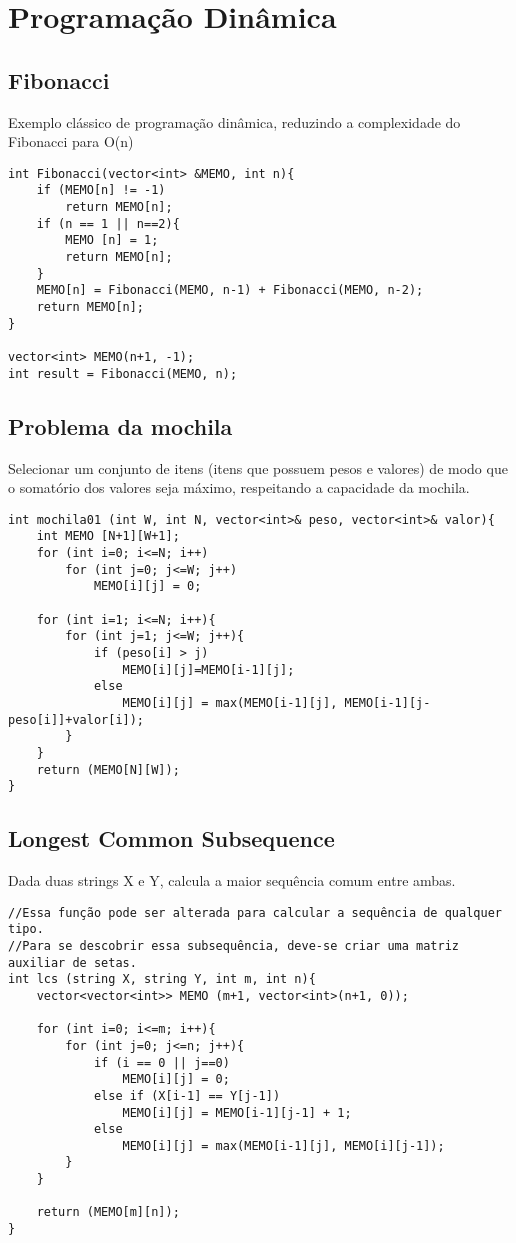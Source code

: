 \section{Programação Dinâmica}
    
    \subsection{Fibonacci}
        Exemplo clássico de programação dinâmica, reduzindo a complexidade do Fibonacci para O(n)
\begin{verbatim}
int Fibonacci(vector<int> &MEMO, int n){
    if (MEMO[n] != -1)
        return MEMO[n];
    if (n == 1 || n==2){
        MEMO [n] = 1;
        return MEMO[n];
    }
    MEMO[n] = Fibonacci(MEMO, n-1) + Fibonacci(MEMO, n-2);
    return MEMO[n];
}

vector<int> MEMO(n+1, -1);
int result = Fibonacci(MEMO, n);    
\end{verbatim}

\subsection{Problema da mochila}
    Selecionar um conjunto de itens (itens que possuem pesos e valores) de modo que o somatório dos valores seja máximo, respeitando a capacidade da mochila.
\begin{verbatim}
int mochila01 (int W, int N, vector<int>& peso, vector<int>& valor){
    int MEMO [N+1][W+1];
    for (int i=0; i<=N; i++)
        for (int j=0; j<=W; j++)
            MEMO[i][j] = 0;

    for (int i=1; i<=N; i++){
        for (int j=1; j<=W; j++){
            if (peso[i] > j)
                MEMO[i][j]=MEMO[i-1][j];
            else
                MEMO[i][j] = max(MEMO[i-1][j], MEMO[i-1][j-peso[i]]+valor[i]);
        }
    }
    return (MEMO[N][W]);
}
\end{verbatim}

\subsection{Longest Common Subsequence}
Dada duas strings X e Y, calcula a maior sequência comum entre ambas.

\begin{verbatim}
//Essa função pode ser alterada para calcular a sequência de qualquer tipo.
//Para se descobrir essa subsequência, deve-se criar uma matriz auxiliar de setas.
int lcs (string X, string Y, int m, int n){
    vector<vector<int>> MEMO (m+1, vector<int>(n+1, 0));

    for (int i=0; i<=m; i++){
        for (int j=0; j<=n; j++){
            if (i == 0 || j==0)
                MEMO[i][j] = 0;
            else if (X[i-1] == Y[j-1])
                MEMO[i][j] = MEMO[i-1][j-1] + 1;
            else
                MEMO[i][j] = max(MEMO[i-1][j], MEMO[i][j-1]);
        }
    }

    return (MEMO[m][n]);
}
\end{verbatim}
\pagebreak

